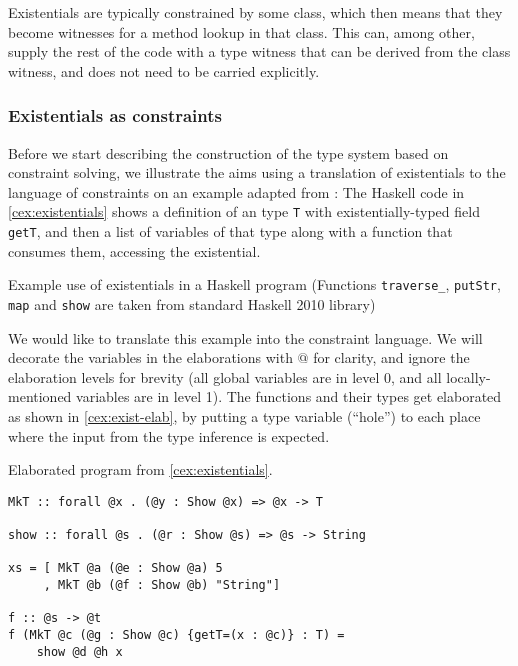 Existentials are typically constrained by some class, which then means that they become witnesses for a method lookup in that class. This can, among other, supply the rest of the code with a type witness that can be derived from the class witness, and does not need to be carried explicitly.

\subsubsection{Existentials as constraints}

Before we start describing the construction of the type system based on constraint solving, we illustrate the aims using a translation of existentials to the language of constraints on an example adapted from \citet{peytonjones2019type}:
The Haskell code in \cref{cex:existentials} shows a definition of an type \lstinline{T} with existentially-typed field \lstinline{getT}, and then a list of variables of that type along with a function that consumes them, accessing the existential.

\begin{codex}

\caption{Example use of existentials in a Haskell program (Functions \texttt{traverse\_}, \texttt{putStr}, \texttt{map} and \texttt{show} are taken from standard Haskell 2010 library)}
\label{cex:existentials}
\end{codex}

We would like to translate this example into the constraint language. We will decorate the variables in the elaborations with $@$ for clarity, and ignore the elaboration levels for brevity (all global variables are in level 0, and all locally-mentioned variables are in level 1). The functions and their types get elaborated as shown in \cref{cex:exist-elab}, by putting a type variable (``hole'') to each place where the input from the type inference is expected.

\begin{codex}
\caption{Elaborated program from \cref{cex:existentials}.}
\label{cex:exist-elab}
\begin{lstlisting}[style=haskellStyle]
MkT :: forall @x . (@y : Show @x) => @x -> T

show :: forall @s . (@r : Show @s) => @s -> String

xs = [ MkT @a (@e : Show @a) 5
     , MkT @b (@f : Show @b) "String"]

f :: @s -> @t
f (MkT @c (@g : Show @c) {getT=(x : @c)} : T) =
    show @d @h x
\end{lstlisting}
\end{codex}

